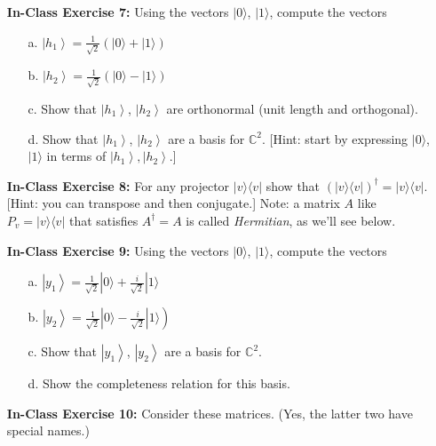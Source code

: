\documentclass[main.tex]{subfiles}
\begin{document}
\begin{enumerate}
\item[] \textbf{In-Class Exercise 7:} Using the vectors $|0\rangle$, $|1\rangle$, compute the vectors

    \begin{enumerate}
        \item[a.] $\left|h_{1}\right\rangle=\frac{1}{\sqrt{2}}(|0\rangle+|1\rangle)$
        \item[b.] $\left|h_{2}\right\rangle=\frac{1}{\sqrt{2}}(|0\rangle-|1\rangle)$
        \item[c.] Show that $\left|h_{1}\right\rangle$, $\left|h_{2}\right\rangle$ are orthonormal (unit length and orthogonal).
        \item[d.] Show that $\left|h_{1}\right\rangle$, $\left|h_{2}\right\rangle$ are a basis for $\mathbb{C}^2$. [Hint: start by expressing $|0\rangle$, $|1\rangle$ in terms of $\left|h_{1}\right\rangle,\left|h_{2}\right\rangle$.]   
        \end{enumerate}

\item[] \textbf{In-Class Exercise 8:} For any projector $|v\rangle\langle v|$ show that $(|v\rangle\langle v|)^{\dagger}=|v\rangle\langle v|$. [Hint: you can transpose and then conjugate.] Note: a matrix $A$ like $P_{v}=|v\rangle\langle v|$ that satisfies $A^{\dagger}=A$ is called \emph{Hermitian}, as we'll see below.

\item[] \textbf{In-Class Exercise 9:} Using the vectors $|0\rangle$, $|1\rangle$, compute the vectors

    \begin{enumerate}
        \item[a.] $\left|y_{1}\right\rangle=\frac{1}{\sqrt{2}}|0\rangle+\frac{i}{\sqrt{2}}|1\rangle$
        \item[b.] $\left.\left|y_{2}\right\rangle=\frac{1}{\sqrt{2}}|0\rangle-\frac{i}{\sqrt{2}}|1\rangle\right)$
        \item[c.] Show that $\left|y_{1}\right\rangle$, $\left|y_{2}\right\rangle$ are a basis for $\mathbb{C}^{2}$.
        \item[d.] Show the completeness relation for this basis.
    \end{enumerate}

\item[] \textbf{In-Class Exercise 10:} Consider these matrices. (Yes, the latter two have special names.)


\end{enumerate}
\end{document}
